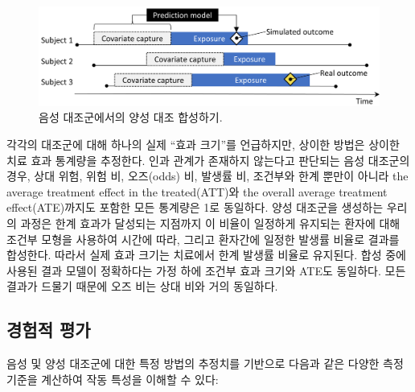 \documentclass[11pt]{book}
\theoremstyle{definition}
\theoremstyle{definition}
\theoremstyle{definition}
\theoremstyle{remark}
\begin{document}
\begin{figure}

{\centering \includegraphics[width=0.9\linewidth]{images/MethodValidity/posControlSynth} 

}

\caption{음성 대조군에서의 양성 대조 합성하기.}\label{fig:posControlSynth}
\end{figure}

각각의 대조군에 대해 하나의 실제 ``효과 크기''를 언급하지만, 상이한
방법은 상이한 치료 효과 통계량을 추정한다. 인과 관계가 존재하지 않는다고
판단되는 음성 대조군의 경우, 상대 위험, 위험 비, 오즈(odds) 비, 발생률
비, 조건부와 한계 뿐만이 아니라 the average treatment effect in the
treated(ATT)와 the overall average treatment effect(ATE)까지도 포함한
모든 통계량은 1로 동일하다. 양성 대조군을 생성하는 우리의 과정은 한계
효과가 달성되는 지점까지 이 비율이 일정하게 유지되는 환자에 대해 조건부
모형을 사용하여 시간에 따라, 그리고 환자간에 일정한 발생률 비율로 결과를
합성한다. 따라서 실제 효과 크기는 치료에서 한계 발생률 비율로 유지된다.
합성 중에 사용된 결과 모델이 정확하다는 가정 하에 조건부 효과 크기와
ATE도 동일하다. 모든 결과가 드물기 때문에 오즈 비는 상대 비와 거의
동일하다.

\subsection{경험적 평가}\label{metrics}


음성 및 양성 대조군에 대한 특정 방법의 추정치를 기반으로 다음과 같은
다양한 측정 기준을 계산하여 작동 특성을 이해할 수 있다:
\end{document}
